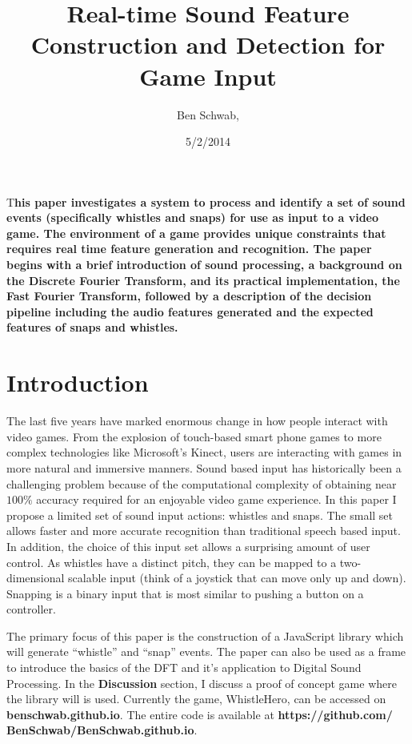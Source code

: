 \documentclass[DIV=calc, paper=a4, fontsize=11pt, twocolumn]{scrartcl}   %
\title{Real-time Sound Feature Construction and Detection for Game Input } %
\author{Ben Schwab, } %
\date{5/2/2014} %
\newcommand{\initial}[1]{ %
\lettrine[lines=3,lhang=0.3,nindent=0em]{
\color{DarkGoldenrod}
{\textsf{#1}}}{}}
\begin{document}
\maketitle %

\thispagestyle{fancy} %



\initial{T}\textbf{his paper investigates a system to process and identify a set of sound events (specifically whistles and snaps) for use as input to a video game. The environment of a game provides unique constraints that requires real time feature generation and recognition. The paper begins with a brief introduction of sound processing, a background on the Discrete Fourier Transform, and its practical implementation, the Fast Fourier Transform, followed by a description of the decision pipeline including the audio features generated and the expected features of snaps and whistles.}

\tableofcontents

\section{Introduction}

\par The last five years have marked enormous change in how people interact with video games. From the explosion of touch-based smart phone games to more complex technologies like Microsoft's Kinect, users are interacting with games in more natural and immersive manners. Sound based input has historically been a challenging problem because of the computational complexity of obtaining near $100\%$ accuracy required for an enjoyable video game experience. In this paper I propose a limited set of sound input actions: whistles and snaps. The small set allows faster and more accurate recognition than traditional speech based input. In addition, the choice of this input set allows a surprising amount of user control. As whistles have a distinct pitch, they can be mapped to a two-dimensional scalable input (think of a joystick that can move only up and down). Snapping is a binary input that is most similar to pushing a button on a controller.
\par The primary focus of this paper is the construction of a JavaScript library which will generate ``whistle'' and ``snap'' events. The paper can also be used as a frame to introduce the basics of the DFT and it's application to Digital Sound Processing. In the \textbf{Discussion} section, I discuss a proof of concept game where the library will is used. Currently the game, WhistleHero, can be accessed on \textbf{benschwab.github.io}. The entire code is available at \textbf{https://github.com/ BenSchwab/BenSchwab.github.io}.
\end{document}
